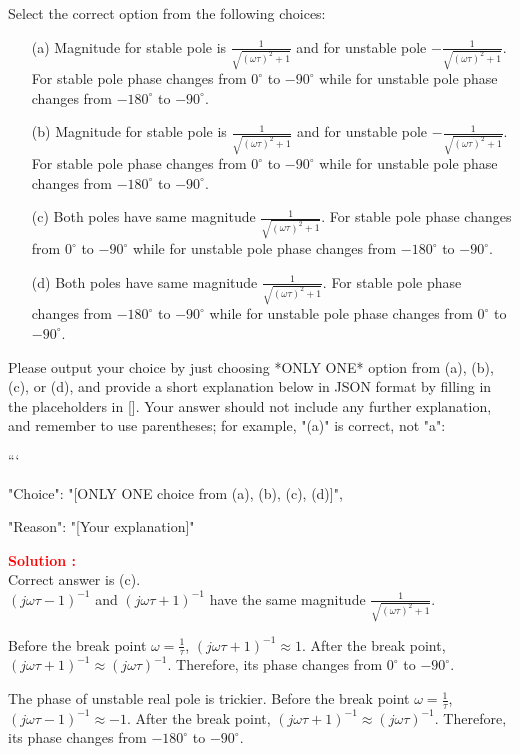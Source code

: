 \documentclass[12pt]{article}
\begin{document}
Select the correct option from the following choices:
\begin{enumerate}
    \item [(a)] Magnitude for stable pole is $\frac{1}{\sqrt{(\omega \tau)^2 +1}}$ and for unstable pole $-\frac{1}{\sqrt{(\omega \tau)^2 +1}}$. For stable pole phase changes from $0^\circ$ to $-90^\circ$ while for unstable pole phase changes from $-180^\circ$ to $-90^\circ$.
    \item [(b)] Magnitude for stable pole is $\frac{1}{\sqrt{(\omega \tau)^2 +1}}$ and for unstable pole $-\frac{1}{\sqrt{(\omega \tau)^2 +1}}$. For stable pole phase changes from $0^\circ$ to $-90^\circ$ while for unstable pole phase changes from $-180^\circ$ to $-90^\circ$.
    \item [(c)]  Both poles have same magnitude $\frac{1}{\sqrt{(\omega \tau)^2 +1}}$. For stable pole phase changes from $0^\circ$ to $-90^\circ$ while for unstable pole phase changes from $-180^\circ$ to $-90^\circ$.
    \item [(d)]  Both poles have same magnitude $\frac{1}{\sqrt{(\omega \tau)^2 +1}}$. For stable pole phase changes from $-180^\circ$ to $-90^\circ$ while for unstable pole phase changes from $0^\circ$ to $-90^\circ$.
\end{enumerate}

Please output your choice by just choosing *ONLY ONE* option from (a), (b), (c), or (d), and provide a short explanation below in JSON format by filling in the placeholders in []. Your answer should not include any further explanation, and remember to use parentheses; for example, "(a)" is correct, not "a": 

```
{

"Choice": "[ONLY ONE choice from (a), (b), (c), (d)]",

"Reason": "[Your explanation]"

}


\textbf{\textcolor{red}{Solution :}} \\
Correct answer is (c).\\
$(j\omega \tau -1)^{-1}$ and $(j\omega \tau +1)^{-1}$ have the same magnitude $\frac{1}{\sqrt{(\omega \tau)^2 +1}}$.

\noindent Before the break point $\omega=\frac{1}{\tau}$, $(j\omega \tau +1)^{-1} \approx 1$. After the break point, $(j\omega \tau +1)^{-1} \approx (j\omega \tau)^{-1}$. Therefore, its phase changes from $0^\circ$ to $-90^\circ$.

\noindent The phase of unstable real pole is trickier. Before the break point $\omega=\frac{1}{\tau}$, $(j\omega \tau -1)^{-1} \approx -1$. After the break point, $(j\omega \tau +1)^{-1} \approx (j\omega \tau)^{-1}$. Therefore, its phase changes from $-180^\circ$ to $-90^\circ$.
\clearpage
\end{document}
